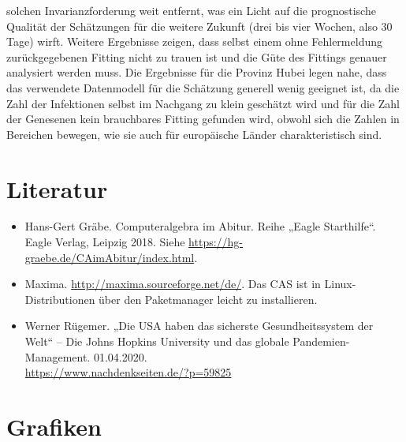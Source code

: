 \documentclass[a4paper,11pt]{article}
\begin{document}
solchen Invarianzforderung weit entfernt, was ein Licht auf die prognostische
Qualität der Schätzungen für die weitere Zukunft (drei bis vier Wochen, also
30 Tage) wirft.  Weitere Ergebnisse zeigen, dass selbst einem ohne
Fehlermeldung zurückgegebenen Fitting nicht zu trauen ist und die Güte des
Fittings genauer analysiert werden muss.  Die Ergebnisse für die Provinz Hubei
legen nahe, dass das verwendete Datenmodell für die Schätzung generell wenig
geeignet ist, da die Zahl der Infektionen selbst im Nachgang zu klein
geschätzt wird und für die Zahl der Genesenen kein brauchbares Fitting
gefunden wird, obwohl sich die Zahlen in Bereichen bewegen, wie sie auch für
europäische Länder charakteristisch sind.

\section{Literatur}

\begin{itemize}
\item Hans-Gert Gräbe. Computeralgebra im Abitur. Reihe „Eagle Starthilfe“.
  Eagle Verlag, Leipzig 2018.  Siehe
  \url{https://hg-graebe.de/CAimAbitur/index.html}.
\item Maxima. \url{http://maxima.sourceforge.net/de/}. Das CAS ist in
  Linux-Distributionen über den Paketmanager leicht zu installieren.
\item Werner Rügemer. „Die USA haben das sicherste Gesundheitssystem der Welt“
  – Die Johns Hopkins University und das globale Pandemien-Management.
  01.04.2020.\\ \url{https://www.nachdenkseiten.de/?p=59825}
\end{itemize}

\section{Grafiken}
\end{document}
